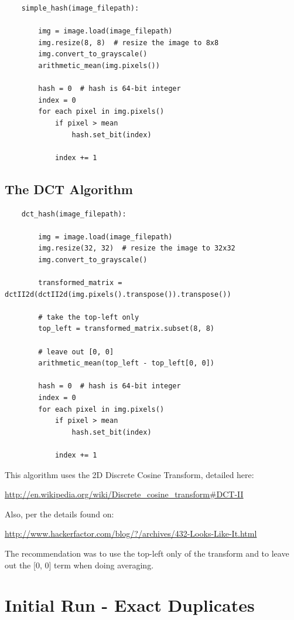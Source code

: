\documentclass[11pt,a4paper,titlepage]{article}
\begin{document}
\begin{lstlisting}
    simple_hash(image_filepath):

        img = image.load(image_filepath)
        img.resize(8, 8)  # resize the image to 8x8
        img.convert_to_grayscale()
        arithmetic_mean(img.pixels())

        hash = 0  # hash is 64-bit integer
        index = 0
        for each pixel in img.pixels()
            if pixel > mean
                hash.set_bit(index)

            index += 1

\end{lstlisting}

\subsection{The DCT Algorithm}

\begin{lstlisting}
    dct_hash(image_filepath):

        img = image.load(image_filepath)
        img.resize(32, 32)  # resize the image to 32x32
        img.convert_to_grayscale()

        transformed_matrix = dctII2d(dctII2d(img.pixels().transpose()).transpose())
        
        # take the top-left only
        top_left = transformed_matrix.subset(8, 8)

        # leave out [0, 0]
        arithmetic_mean(top_left - top_left[0, 0])

        hash = 0  # hash is 64-bit integer
        index = 0
        for each pixel in img.pixels()
            if pixel > mean
                hash.set_bit(index)

            index += 1

\end{lstlisting}

This algorithm uses the 2D Discrete Cosine Transform, detailed here:

\url{http://en.wikipedia.org/wiki/Discrete_cosine_transform#DCT-II}

Also, per the details found on:

\url{http://www.hackerfactor.com/blog/?/archives/432-Looks-Like-It.html}

The recommendation was to use the top-left only of the transform and to leave
out the [0, 0] term when doing averaging.

\section{Initial Run - Exact Duplicates}
\end{document}
